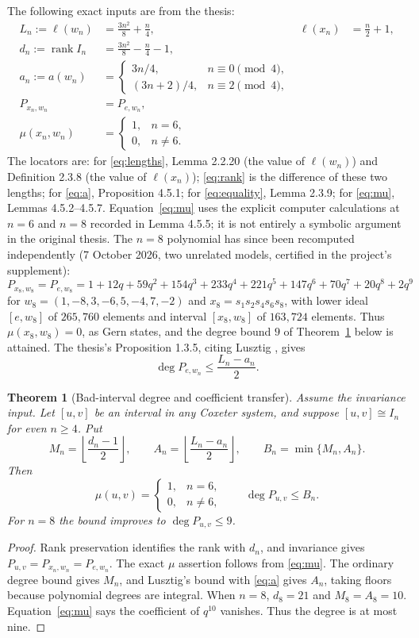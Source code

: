 \documentclass[11pt]{article}
\newtheorem{theorem}{Theorem}[section]
\theoremstyle{definition}\newtheorem{definition}[theorem]{Definition}
\theoremstyle{remark}\newtheorem{remark}[theorem]{Remark}
\begin{document}
The following exact inputs are from the thesis:
\begin{align}
 L_n:=\ell(w_n)&=\frac{3n^2}{8}+\frac n4,
 &\ell(x_n)&=\frac n2+1,\label{eq:lengths}\\
 d_n:=\operatorname{rank} I_n&=\frac{3n^2}{8}-\frac n4-1,\label{eq:rank}\\
 a_n:=a(w_n)&=\begin{cases}
 3n/4,&n\equiv0\pmod4,\\
 (3n+2)/4,&n\equiv2\pmod4,
 \end{cases}\label{eq:a}\\
 P_{x_n,w_n}&=P_{e,w_n},\label{eq:equality}\\
 \mu(x_n,w_n)&=\begin{cases}1,&n=6,\\0,&n\ne6.\end{cases}\label{eq:mu}
\end{align}
The locators are: for \eqref{eq:lengths}, Lemma 2.2.20 (the value of
$\ell(w_n)$) and Definition 2.3.8 (the value of $\ell(x_n)$); \eqref{eq:rank}
is the difference of these two lengths; for \eqref{eq:a}, Proposition 4.5.1;
for \eqref{eq:equality}, Lemma 2.3.9; for \eqref{eq:mu}, Lemmas 4.5.2--4.5.7.
Equation~\eqref{eq:mu} uses the explicit computer calculations at
$n=6$ and $n=8$ recorded in Lemma 4.5.5; it is not entirely a symbolic
argument in the original thesis.
The $n=8$ polynomial has since been recomputed independently (7 October 2026,
two unrelated models, certified in the project's supplement):
\[
 P_{x_8,w_8}=P_{e,w_8}=1+12q+59q^2+154q^3+233q^4+221q^5+147q^6+70q^7+20q^8+2q^9
\]
for $w_8=(1,-8,3,-6,5,-4,7,-2)$ and $x_8=s_1s_2s_4s_6s_8$, with lower ideal
$[e,w_8]$ of $265{,}760$ elements and interval $[x_8,w_8]$ of $163{,}724$
elements. Thus $\mu(x_8,w_8)=0$, as Gern states, and the degree bound $9$ of
Theorem~\ref{thm:bad} below is attained.
The thesis's Proposition 1.3.5, citing Lusztig \cite[1.3(a)]{lusztig}, gives
\[
 \deg P_{e,w_n}\leq \frac{L_n-a_n}{2}.
\]

\begin{theorem}[Bad-interval degree and coefficient transfer]\label{thm:bad}
Assume the invariance input. Let $[u,v]$ be an interval in any Coxeter
system, and suppose $[u,v]\cong I_n$ for even $n\geq4$. Put
\[
 M_n=\left\lfloor\frac{d_n-1}{2}\right\rfloor,
 \qquad A_n=\left\lfloor\frac{L_n-a_n}{2}\right\rfloor,
 \qquad B_n=\min\{M_n,A_n\}.
\]
Then
\[
 \mu(u,v)=\begin{cases}1,&n=6,\\0,&n\ne6,\end{cases}
 \qquad \deg P_{u,v}\leq B_n.
\]
For $n=8$ the bound improves to $\deg P_{u,v}\leq9$.
\end{theorem}
\begin{proof}
Rank preservation identifies the rank with $d_n$, and invariance gives
$P_{u,v}=P_{x_n,w_n}=P_{e,w_n}$. The exact $\mu$ assertion follows from
\eqref{eq:mu}. The ordinary degree bound gives $M_n$, and Lusztig's
bound with \eqref{eq:a} gives $A_n$, taking floors because polynomial
degrees are integral. When $n=8$, $d_8=21$ and $M_8=A_8=10$.
Equation~\eqref{eq:mu} says the coefficient of $q^{10}$ vanishes.
Thus the degree is at most nine.
\end{proof}
\end{document}
